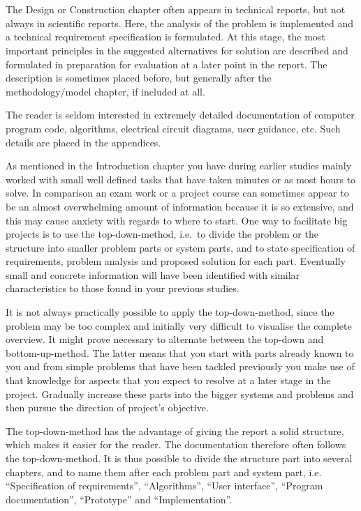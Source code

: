 \section{}\label{sec:construction}
The Design or Construction chapter often appears in technical reports, but not
always in scientific reports. Here, the analysis of the problem is implemented
and a technical requirement specification is formulated. At this stage, the most
important principles in the suggested alternatives for solution are described
and formulated in preparation for evaluation at a later point in the report. The
description is sometimes placed before, but generally after the
methodology/model chapter, if included at all.

The reader is seldom interested in extremely detailed documentation of computer
program code, algorithms, electrical circuit diagrams, user guidance, etc. Such
details are placed in the appendices.

As mentioned in the Introduction chapter you have during earlier studies mainly
worked with small well defined tasks that have taken minutes or as most hours to
solve. In comparison an exam work or a project course can sometimes appear to be
an almost overwhelming amount of information because it is so extensive, and
this may cause anxiety with regards to where to start. One way to facilitate big
projects is to use the top-down-method, i.e.\ to divide the problem or the
structure into smaller problem parts or system parts, and to state specification
of  requirements, problem analysis and proposed solution for each part.
Eventually small and concrete information will have been identified with similar
characteristics to those found in your previous studies.

It is not always practically possible to apply the top-down-method, since the
problem may be too complex and initially very difficult to visualise the
complete overview. It might prove necessary to alternate between the top-down 
and bottom-up-method. The latter means that you start with parts already known
to you and from simple problems that have been tackled previously you  make use
of that knowledge for aspects that you expect to resolve at a later stage in the
project. Gradually increase these parts into the bigger systems and problems and
then pursue the direction of project's objective.

The top-down-method has the advantage of giving the report a solid structure,
which makes it easier for the reader. The documentation therefore often follows
the top-down-method. It is thus possible to divide the structure part into
several chapters, and to name them after each problem part and system part, i.e.
``Specification of requirements'', ``Algorithms'', ``User interface'', ``Program
documentation'', ``Prototype'' and ``Implementation''.
